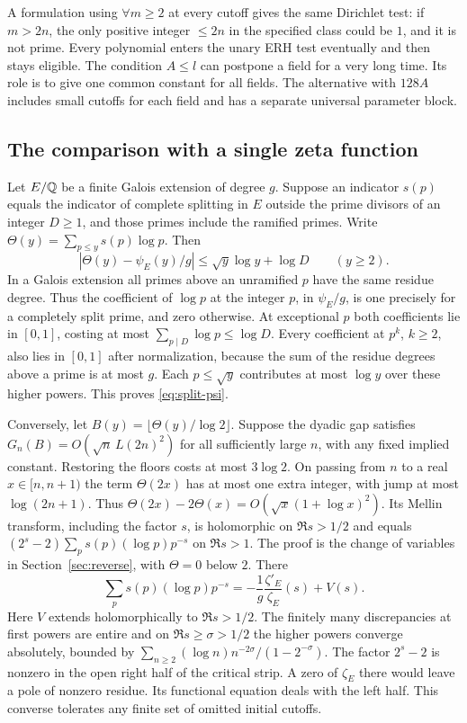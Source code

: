 A formulation using $\forall m\ge2$ at every cutoff gives the same Dirichlet test: if $m>2n$, the only positive integer $\le2n$ in the specified class could be $1$, and it is not prime. Every polynomial enters the unary ERH test eventually and then stays eligible. The condition $A\le l$ can postpone a field for a very long time. Its role is to give one common constant for all fields. The alternative with $128A$ includes small cutoffs for each field and has a separate universal parameter block.

\subsection*{The comparison with a single zeta function}
Let $E/\mathbb Q$ be a finite Galois extension of degree $g$. Suppose an indicator $s(p)$ equals the indicator of complete splitting in $E$ outside the prime divisors of an integer $D\ge1$, and those primes include the ramified primes. Write $\Theta(y)=\sum_{p\le y}s(p)\log p$. Then
\begin{equation}\label{eq:split-psi}
  |\Theta(y)-\psi_E(y)/g|\le \sqrt y\log y+\log D\qquad(y\ge2).
\end{equation}
In a Galois extension all primes above an unramified $p$ have the same residue degree. Thus the coefficient of $\log p$ at the integer $p$, in $\psi_E/g$, is one precisely for a completely split prime, and zero otherwise. At exceptional $p$ both coefficients lie in $[0,1]$, costing at most $\sum_{p\mid D}\log p\le\log D$. Every coefficient at $p^k$, $k\ge2$, also lies in $[0,1]$ after normalization, because the sum of the residue degrees above a prime is at most $g$. Each $p\le\sqrt y$ contributes at most $\log y$ over these higher powers. This proves \eqref{eq:split-psi}.

Conversely, let $B(y)=\lfloor\Theta(y)/\log 2\rfloor$. Suppose the dyadic gap satisfies $G_n(B)=O(\sqrt n\,L(2n)^2)$ for all sufficiently large $n$, with any fixed implied constant. Restoring the floors costs at most $3\log 2$. On passing from $n$ to a real $x\in[n,n+1)$ the term $\Theta(2x)$ has at most one extra integer, with jump at most $\log(2n+1)$. Thus $\Theta(2x)-2\Theta(x)=O(\sqrt x(1+\log x)^2)$. Its Mellin transform, including the factor $s$, is holomorphic on $\Re s>1/2$ and equals $(2^s-2)\sum_p s(p)(\log p)p^{-s}$ on $\Re s>1$. The proof is the change of variables in Section~\ref{sec:reverse}, with $\Theta=0$ below $2$. There
\[
 \sum_p s(p)(\log p)p^{-s}
    =-\frac{1}{g}\frac{\zeta'_E}{\zeta_E}(s)+V(s).
\]
Here $V$ extends holomorphically to $\Re s>1/2$. The finitely many discrepancies at first powers are entire and on $\Re s\ge\sigma>1/2$ the higher powers converge absolutely, bounded by $\sum_{n\ge2}(\log n)n^{-2\sigma}/(1-2^{-\sigma})$. The factor $2^s-2$ is nonzero in the open right half of the critical strip. A zero of $\zeta_E$ there would leave a pole of nonzero residue. Its functional equation deals with the left half. This converse tolerates any finite set of omitted initial cutoffs.

